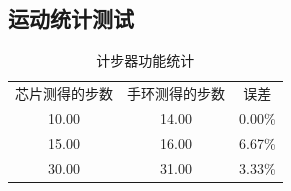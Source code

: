 \documentclass[scheme=chinese,a4paper]{article}
\begin{document}
\begin{appendices}
\subsection{运动统计测试}
\begin{table}[H]
  \centering
    \begin{tabular}{ccc}
    \toprule
    \multirow{2}[2]{*}{芯片测得的步数} & \multirow{2}[2]{*}{手环测得的步数} & \multirow{2}[2]{*}{误差} \\
          &       &  \\
    \midrule
    10.00  & 14.00  & 0.00\% \\
    \midrule
    15.00  & 16.00  & 6.67\% \\
    \midrule
    30.00  & 31.00  & 3.33\% \\
    \bottomrule
    \end{tabular}%
  \caption{计步器功能统计}
  \label{tab:addlabel}%
\end{table}%
\end{appendices}
\end{document}
